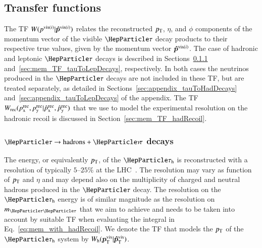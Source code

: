 \subsection{Transfer functions}
\label{sec:mem_TF}

The TF $W(p^{\textrm{vis}(i)}|\bm{\hat{p}}^{\textrm{vis}(i)})$ relates the reconstructed
$p_{\textrm{T}}$, $\eta$, and $\phi$ components of the momentum vector of the
visible $\Pgt$ decay products to their respective true values,
given by the momentum vector $\bm{\hat{p}}^{\textrm{vis}(i)}$.
The case of hadronic and leptonic $\Pgt$ decays is described in
Sections~\ref{sec:mem_TF_tauToHadDecays}
and~\ref{sec:mem_TF_tauToLepDecays}, respectively.
In both cases the neutrinos produced in the $\Pgt$ decays are not
included in these TF, but are treated separately, as detailed in Sections~\ref{sec:appendix_tauToHadDecays} and~\ref{sec:appendix_tauToLepDecays} of the appendix.
The TF $W_{\textrm{rec}}( p_{\textrm{x}}^{\textrm{rec}},p_{\textrm{y}}^{\textrm{rec}} | \hat{p}_{\textrm{x}}^{\textrm{rec}},\hat{p}_{\textrm{y}}^{\textrm{rec}} )$ that we use to model the experimental resolution on the
hadronic recoil is discussed in Section~\ref{sec:mem_TF_hadRecoil}.


\subsubsection{$\Pgt \to \textrm{hadrons} + \Pnut$ decays}
\label{sec:mem_TF_tauToHadDecays}

The energy, or equivalently $p_{\textrm{T}}$, of the $\tauh$ 
is reconstructed with a
resolution of typically $5$--$25\%$ at the
LHC~\cite{Aad:2014rga,TAU-14-001}.
The resolution may vary as function of $p_{\textrm{T}}$ and $\eta$ and may depend
also on the multiplicity of charged and neutral hadrons produced in the $\Pgt$ decay.
The resolution on the $\tauh$ energy is of similar magnitude as the
resolution on $m_{\Pgt\Pgt}$ that we aim to achieve and needs to be
taken into account by suitable TF when evaluating the integral in
Eq.~\ref{eq:mem_with_hadRecoil}.
We denote the TF that models the $p_{\textrm{T}}$ of the $\tauh$ system by
$W_{\textrm{h}}( \bm{p}_{\textrm{T}}^{\textrm{vis}} | \bm{\hat{p}}_{\textrm{T}}^{\textrm{vis}} )$.

